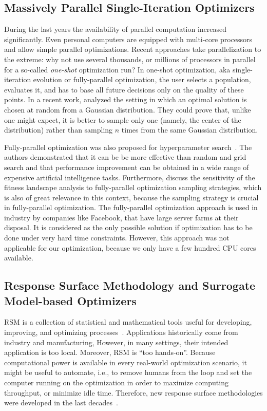 \documentclass[conference]{IEEEtran}
\begin{document}
\subsection{Massively Parallel Single-Iteration Optimizers}\label{sec:parallel}
During the last years the availability of parallel computation increased significantly. 
Even personal computers are equipped with multi-core processors and allow simple parallel optimizations. Recent approaches take parallelization to the extreme: why not use several thousands, or millions of processors in parallel for a so-called \emph{one-shot} optimization run?
In one-shot optimization, aka single-iteration evolution or fully-parallel optimization, the user selects a population, evaluates it, and has to base all future decisions only on the quality of these points.
In a recent work, \citet{Cauw20a} analyzed the setting in which an optimal solution is chosen at random from a Gaussian distribution.
They could prove that, unlike one might expect, it is better to sample only one (namely, the center of the distribution) rather than sampling $n$ times from the same Gaussian distribution.

Fully-parallel optimization was also proposed for hyperparameter search~\citep{Cauw20a}.
The authors  demonstrated that it can be be more effective than random and grid search and that performance improvement can be obtained in a wide range of expensive artificial intelligence tasks.
Furthermore, \citet{Rena20a} discuss the sensitivity of the fitness landscape analysis to fully-parallel optimization sampling strategies, which is also of great relevance in this context, because the sampling strategy is crucial in fully-parallel optimization.
The fully-parallel optimization approach is used in industry by companies like Facebook, that have large server farms at their disposal.
It is considered as the only possible solution if optimization has to be done under very hard time constraints. 
However, this approach was not applicable for our optimization, because we only have a few hundred CPU cores available.

\subsection{Response Surface Methodology and Surrogate Model-based Optimizers}\label{sec:rsm}
\gls{RSM} is a collection of statistical and mathematical tools useful for developing, improving, and optimizing processes~\citep{Myers2016}. 
Applications historically come from industry and manufacturing, 
However, in many settings, their intended application is too local. Moreover, \gls{RSM} is ``too hands-on''.
Because computational power is available in every real-world optimization scenario, 
it might be useful to automate, i.e., to remove humans from the loop and set the computer running on the optimization in order to maximize computing throughput, or minimize idle time. 
Therefore, new response surface methodologies were developed in the last decades~\citep{Gram20a}.
 
\end{document}

